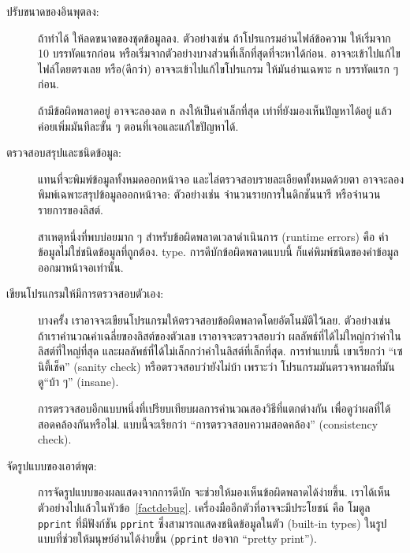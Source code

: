 \begin{description}

\item[ปรับขนาดของอินพุตลง:] 
ถ้าทำได้ ให้ลดขนาดของชุดข้อมูลลง.
ตัวอย่างเช่น ถ้าโปรแกรมอ่านไฟล์ข้อความ
ให้เริ่มจาก 10 บรรทัดแรกก่อน หรือเริ่มจากตัวอย่างบางส่วนที่เล็กที่สุดที่จะหาได้ก่อน.
อาจจะเข้าไปแก้ไขไฟล์โดยตรงเลย หรือ(ดีกว่า) อาจจะเข้าไปแก้ไขโปรแกรม ให้มันอ่านเฉพาะ \texttt{n} บรรทัดแรก ๆ ก่อน. 

ถ้ามีข้อผิดพลาดอยู่ อาจจะลองลด \texttt{n} ลงให้เป็นค่าเล็กที่สุด เท่าที่ยังมองเห็นปัญหาได้อยู่
แล้วค่อยเพิ่มมันทีละขั้น ๆ ตอนที่เจอและแก้ไขปัญหาได้.

\item[ตรวจสอบสรุปและชนิดข้อมูล:] 
แทนที่จะพิมพ์ข้อมูลทั้งหมดออกหน้าจอ และไล่ตรวจสอบรายละเอียดทั้งหมดด้วยตา
อาจจะลองพิมพ์เฉพาะสรุปข้อมูลออกหน้าจอ: ตัวอย่างเช่น
จำนวนรายการในดิกชันนารี หรือจำนวนรายการของลิสต์.

สาเหตุหนึ่งที่พบบ่อยมาก ๆ สำหรับข้อผิดพลาดเวลาดำเนินการ (runtime errors) คือ ค่าข้อมูลไม่ใช่ชนิดข้อมูลที่ถูกต้อง.
type.  
การดีบักข้อผิดพลาดแบบนี้ ก็แค่พิมพ์ชนิดของค่าข้อมูลออกมาหน้าจอเท่านั้น.

\item[เขียนโปรแกรมให้มีการตรวจสอบตัวเอง:]  
บางครั้ง เราอาจจะเขียนโปรแกรมให้ตรวจสอบข้อผิดพลาดโดยอัตโนมัติไว้เลย.
ตัวอย่างเช่น ถ้าเราคำนวณค่าเฉลี่ยของลิสต์ของตัวเลข
เราอาจจะตรวจสอบว่า ผลลัพธ์ที่ได้ไม่ใหญ่กว่าค่าในลิสต์ที่ใหญ่ที่สุด และผลลัพธ์ที่ได้ไม่เล็กกว่าค่าในลิสต์ที่เล็กที่สุด.
การทำแบบนี้ เขาเรียกว่า ``เซนิตี้เช็ค'' (sanity check) หรือตรวจสอบว่ายังไม่บ้า
เพราะว่า โปรแกรมมันตรวจหาผลที่มันดู``บ้า ๆ'' (insane).

การตรวจสอบอีกแบบหนึ่งที่เปรียบเทียบผลการคำนวณสองวิธีที่แตกต่างกัน เพื่อดูว่าผลที่ได้สอดคล้องกันหรือไม่.
แบบนี้จะเรียกว่า ``การตรวจสอบความสอดคล้อง'' (consistency check).

\item[จัดรูปแบบของเอาต์พุต:] การจัดรูปแบบของผลแสดงจากการดีบัก จะช่วยให้มองเห็นข้อผิดพลาดได้ง่ายขึ้น.
เราได้เห็นตัวอย่างไปแล้วในหัวข้อ~\ref{factdebug}.  
เครื่องมืออีกตัวที่อาจจะมีประโยชน์ คือ โมดูล \texttt{pprint} ที่มีฟังก์ชัน \texttt{pprint} ซึ่งสามารถแสดงชนิดข้อมูลในตัว (built-in types) ในรูปแบบที่ช่วยให้มนุษย์อ่านได้ง่ายขึ้น
(\texttt{pprint} ย่อจาก ``pretty print'').

\end{description}

